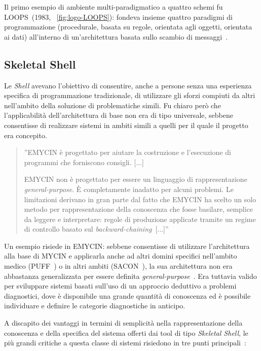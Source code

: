 Il primo esempio di ambiente multi-paradigmatico a quattro schemi fu LOOPS~(1983, \figurename~\ref{fig:logo-LOOPS}): fondeva insieme quattro paradigmi di programmazione (procedurale, basata su regole, orientata agli oggetti, orientata ai dati) all'interno di un'architettura basata sullo scambio di messaggi~\cite{loops1983aaai}.

\subsection{Skeletal Shell}
Le \emph{Shell} avevano l'obiettivo di consentire, anche a persone senza una esperienza specifica di programmazione tradizionale, di utilizzare gli sforzi compiuti da altri nell'ambito della soluzione di problematiche simili.
Fu chiaro però che l'applicabilità dell'architettura di base non era di tipo universale, sebbene consentisse di realizzare sistemi in ambiti simili a quelli per il quale il progetto era concepito.

\begin{quotation}
''EMYCIN è progettato per aiutare la costruzione e l'esecuzione di programmi che forniscono consigli. [$\dots$]

EMYCIN non è progettato per essere un linguaggio di rappresentazione \emph{general-purpose}. \`E completamente inadatto per alcuni problemi. Le limitazioni derivano in gran parte dal fatto che EMYCIN ha scelto un solo metodo per rappresentazione della conoscenza che fosse basilare, semplice da leggere e interpretare: regole di produzione applicate tramite un regime di controllo basato sul \emph{backward-chaining}~[$\dots$]''~\cite{puff1982}
\end{quotation}

Un esempio risiede in EMYCIN: sebbene consentisse di utilizzare l'architettura alla base di MYCIN e applicarla anche ad altri domini specifici nell'ambito medico (PUFF~\cite{puff1982}) o in altri ambiti (SACON~\cite{bennett1979}), la sua architettura non era abbastanza generalizzata per essere definita \emph{general-purpose}~\cite{vanmelle1984}. Era tuttavia valido per sviluppare sistemi basati sull'uso di un approccio deduttivo a problemi diagnostici, dove è disponibile una grande quantità di conoscenza ed è possibile individuare e definire le categorie diagnostiche in anticipo.

A discapito dei vantaggi in termini di semplicità nella rappresentazione della conoscenza e della specifica del sistema offerti dai tool di tipo \emph{Skeletal Shell}, le più grandi critiche a questa classe di sistemi risiedono in tre punti principali~\cite{Aikins1983163}:

